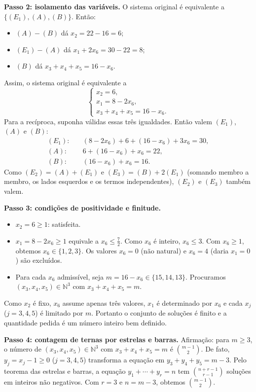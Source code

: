 \documentclass{article}%
\begin{document}
\textbf{Passo 2: isolamento das variáveis.} O sistema original é equivalente a $\{(E_1),(A),(B)\}$. Então:
\begin{itemize}
\item $(A)-(B)$ dá $x_2=22-16=6$;
\item $(E_1)-(A)$ dá $x_1+2x_6=30-22=8$;
\item $(B)$ dá $x_3+x_4+x_5=16-x_6$.
\end{itemize}
Assim, o sistema original é equivalente a
\begin{equation*}
\begin{cases}
x_2=6,\\
x_1=8-2x_6,\\
x_3+x_4+x_5=16-x_6.
\end{cases}
\end{equation*}
Para a recíproca, suponha válidas essas três igualdades. Então valem $(E_1)$, $(A)$ e $(B)$:
\begin{align*}
(E_1):&\quad (8-2x_6)+6+(16-x_6)+3x_6=30,\\
(A):&\quad 6+(16-x_6)+x_6=22,\\
(B):&\quad (16-x_6)+x_6=16.
\end{align*}
Como $(E_2)=(A)+(E_1)$ e $(E_3)=(B)+2(E_1)$ (somando membro a membro, os lados esquerdos e os termos independentes), $(E_2)$ e $(E_3)$ também valem.

\textbf{Passo 3: condições de positividade e finitude.}
\begin{itemize}
\item $x_2=6\geq 1$: satisfeita.
\item $x_1=8-2x_6\geq 1$ equivale a $x_6\leq \frac{7}{2}$. Como $x_6$ é inteiro, $x_6\leq 3$. Com $x_6\geq 1$, obtemos $x_6\in\{1,2,3\}$. Os valores $x_6=0$ (não natural) e $x_6=4$ (daria $x_1=0$) são excluídos.
\item Para cada $x_6$ admissível, seja $m=16-x_6\in\{15,14,13\}$. Procuramos $(x_3,x_4,x_5)\in\mathbb{N}^3$ com $x_3+x_4+x_5=m$.
\end{itemize}
Como $x_2$ é fixo, $x_6$ assume apenas três valores, $x_1$ é determinado por $x_6$ e cada $x_j$ ($j=3,4,5$) é limitado por $m$. Portanto o conjunto de soluções é finito e a quantidade pedida é um número inteiro bem definido.

\textbf{Passo 4: contagem de ternas por estrelas e barras.} Afirmação: para $m\geq 3$, o número de $(x_3,x_4,x_5)\in\mathbb{N}^3$ com $x_3+x_4+x_5=m$ é $\binom{m-1}{2}$. De fato, $y_j=x_j-1\geq 0$ ($j=3,4,5$) transforma a equação em $y_3+y_4+y_5=m-3$. Pelo teorema das estrelas e barras, a equação $y_1+\cdots+y_r=n$ tem $\binom{n+r-1}{r-1}$ soluções em inteiros não negativos. Com $r=3$ e $n=m-3$, obtemos $\binom{m-1}{2}$.
\end{document}
